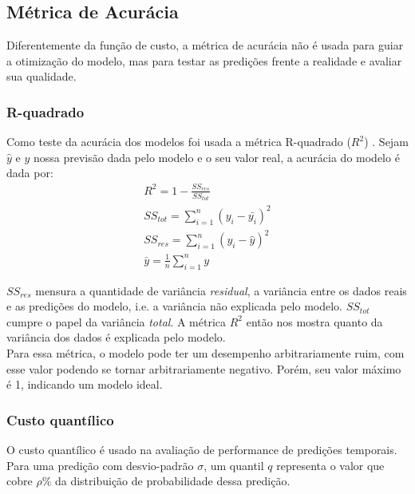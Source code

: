 \subsection{Métrica de Acurácia}

Diferentemente da função de custo, a métrica de acurácia não é usada para guiar a otimização do modelo,
mas para testar as predições frente a realidade e avaliar sua qualidade. \\

\subsubsection{R-quadrado}
Como teste da acurácia dos modelos foi usada a métrica R-quadrado ($R^2$) \citep{cohen}. Sejam $\hat{y}$ e $y$ nossa previsão dada pelo modelo e o seu valor real, a acurácia do modelo é dada por:\\

\begin{align}
&R^2 = 1 - \frac{SS_{res}}{SS_{tot}} &\\
&SS_{tot} = \sum^n_{i=1} (y_i- \bar{y_i})^2 &\\
&SS_{res} = \sum^n_{i=1} (y_i - \hat{y})^2 &\\
&\bar{y} = \frac{1}{n} \sum^n_{i=1} y &
\end{align}

$SS_{res}$ mensura a quantidade de variância \textit{residual}, a
variância entre os dados reais e as predições do modelo, i.e. a variância não
explicada pelo modelo. $SS_{tot}$ cumpre o papel da variância \textit{total}. A métrica $R^2$
então nos mostra quanto da variância dos dados é explicada pelo modelo. \\

Para essa métrica, o modelo pode ter um desempenho arbitrariamente ruim, com esse valor
podendo se tornar arbitrariamente negativo. Porém, seu valor máximo é 1,
indicando um modelo ideal.\\


\subsubsection{Custo quantílico}
\label{sec:quant}
O custo quantílico \citep{deepar} é usado na avaliação de performance de
predições temporais. \\

Para uma predição com desvio-padrão $\sigma$, um quantil $q$ representa o
valor que cobre $\rho\%$ da distribuição de probabilidade dessa predição.

